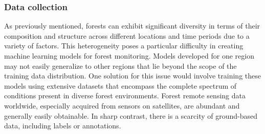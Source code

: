 \documentclass{CUP-JNL-DTM}%
\theoremstyle{definition}
\numberwithin{equation}{section}
\begin{document}
\subsubsection{Data collection}
\label{sec:challenge_data}
As previously mentioned, forests can exhibit significant diversity in terms of their composition and structure across different locations and time periods due to a variety of factors.
This heterogeneity poses a particular difficulty in creating machine learning models for forest monitoring. Models developed for one region may not easily generalize to other regions that lie beyond the scope of the training data distribution.
One solution for this issue would involve training these models using extensive datasets that encompass the complete spectrum of conditions present in diverse forest environments.
Forest remote sensing data worldwide, especially acquired from sensors on satellites, are abundant and generally easily obtainable. In sharp contrast, there is a scarcity of ground-based data, including labels or annotations.
\end{document}
